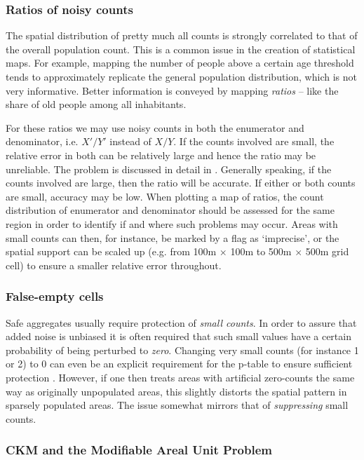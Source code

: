 \subsubsection{Ratios of noisy counts}

The spatial distribution of pretty much all counts is strongly correlated to that of the overall population count. This is a common issue in the creation of statistical maps. For example, mapping the number of people above a certain age threshold tends to approximately replicate the general population distribution, which is not very informative. Better information is conveyed by mapping \emph{ratios} -- like the share of old people among all inhabitants.

For these ratios we may use noisy counts in both the enumerator and denominator, i.e. $X'/Y'$ instead of $X/Y$. If the counts involved are small, the relative error in both can be relatively large and hence the ratio may be unreliable. The problem is discussed in detail in \citet{EnderleEtAl2018}. Generally speaking, if the counts involved are large, then the ratio will be accurate. If either or both counts are small, accuracy may be low. When plotting a map of ratios, the count distribution of enumerator and denominator should be assessed for the same region in order to identify if and where such problems may occur. Areas with small counts can then, for instance, be marked by a flag as `imprecise', or the spatial support can be scaled up (e.g. from 100m $\times$ 100m to 500m $\times$ 500m grid cell) to ensure a smaller relative error throughout.

\subsubsection{False-empty cells}

Safe aggregates usually require protection of \emph{small counts}. In order to assure that added noise is unbiased it is often required that such small values have a certain probability of being perturbed to \emph{zero}. Changing very small counts (for instance 1 or 2) to 0 can even be an explicit requirement for the p-table to ensure sufficient protection \citep{GiessingHoehne2010}.
However, if one then treats areas with artificial zero-counts the same way as originally unpopulated areas, this slightly distorts the spatial pattern in sparsely populated areas. The issue somewhat mirrors that of \emph{suppressing} small counts.

\subsubsection{CKM and the Modifiable Areal Unit Problem}

